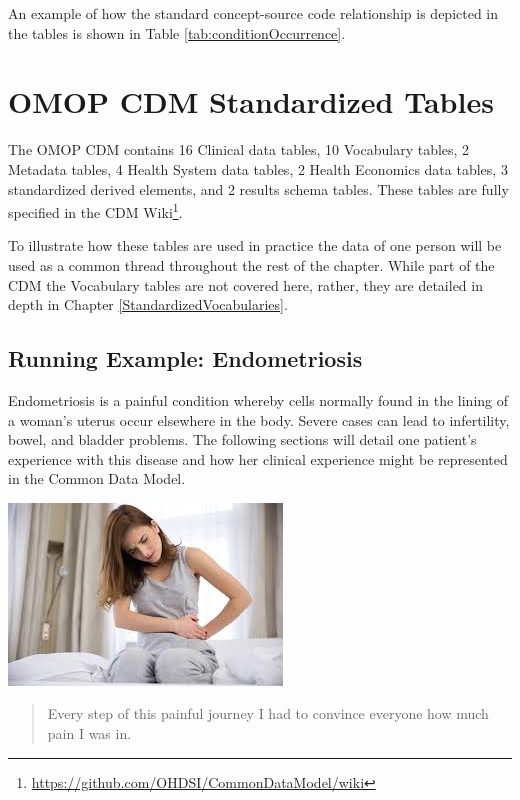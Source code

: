 \documentclass[11pt]{book}
\let\rmarkdownfootnote\footnote%
\def\footnote{\protect\rmarkdownfootnote}
\theoremstyle{definition}
\theoremstyle{definition}
\theoremstyle{definition}
\theoremstyle{remark}
\begin{document}
An example of how the standard concept-source code relationship is depicted in the tables is shown in Table \ref{tab:conditionOccurrence}.

\hypertarget{omop-cdm-standardized-tables}{%
\section{OMOP CDM Standardized Tables}\label{omop-cdm-standardized-tables}}

The OMOP CDM contains 16 Clinical data tables, 10 Vocabulary tables, 2 Metadata tables, 4 Health System data tables, 2 Health Economics data tables, 3 standardized derived elements, and 2 results schema tables. These tables are fully specified in the CDM Wiki\footnote{\url{https://github.com/OHDSI/CommonDataModel/wiki}}.

To illustrate how these tables are used in practice the data of one person will be used as a common thread throughout the rest of the chapter. While part of the CDM the Vocabulary tables are not covered here, rather, they are detailed in depth in Chapter \ref{StandardizedVocabularies}.

\hypertarget{running-example-endometriosis}{%
\subsection{Running Example: Endometriosis}\label{running-example-endometriosis}}

Endometriosis is a painful condition whereby cells normally found in the lining of a woman's uterus occur elsewhere in the body. Severe cases can lead to infertility, bowel, and bladder problems. The following sections will detail one patient's experience with this disease and how her clinical experience might be represented in the Common Data Model.

\begin{center}\includegraphics[width=0.5\linewidth]{images/CommonDataModel/Lauren} \end{center}

\begin{quote}
Every step of this painful journey I had to convince everyone how much pain I was in.
\end{quote}
\end{document}
